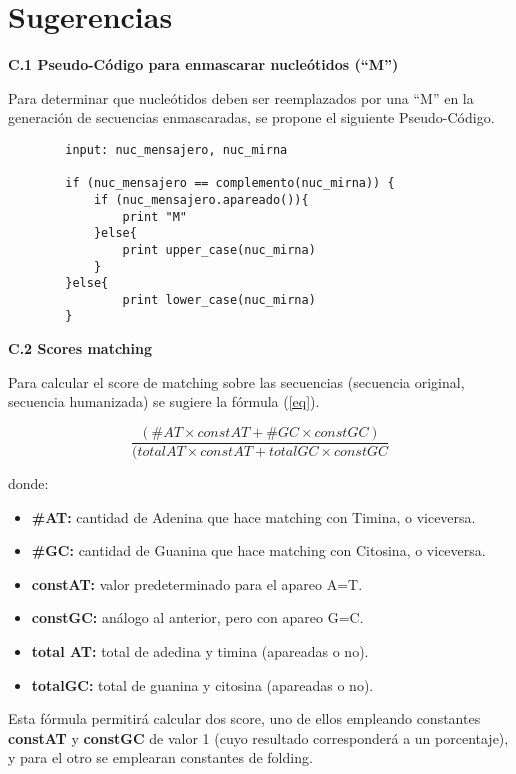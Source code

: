 \section{Sugerencias}
\label{appendix-formulates}

	\large \textbf{C.1 Pseudo-Código para enmascarar nucleótidos (``M'')}
	\par Para determinar que nucleótidos deben ser reemplazados por una ``M'' en la generación de secuencias enmascaradas, 		se propone el siguiente Pseudo-Código.

    \begin{verbatim}
        input: nuc_mensajero, nuc_mirna

        if (nuc_mensajero == complemento(nuc_mirna)) {
            if (nuc_mensajero.apareado()){
                print "M"
            }else{
                print upper_case(nuc_mirna)			
            }	
        }else{
                print lower_case(nuc_mirna)
        }                
    \end{verbatim}

	\large \textbf{C.2 Scores matching}
	\par Para calcular el score de matching sobre las secuencias (secuencia original, secuencia humanizada) se sugiere la 		fórmula (\ref{eq}).

	\begin{equation}	
		\label{eq} \frac{(\#AT \times constAT + \#GC \times constGC)}{(totalAT \times constAT + totalGC \times constGC}
	\end{equation}	

	\par donde:
		\begin{itemize}
			\item \textbf{\#AT:} cantidad de Adenina que hace matching con Timina, o viceversa.
			\item \textbf{\#GC:} cantidad de Guanina que hace matching con Citosina, o viceversa.
			\item \textbf{constAT:} valor predeterminado para el apareo A=T.
			\item \textbf{constGC:} análogo al anterior, pero con apareo G=C.
			\item \textbf{total AT:} total de adedina y timina (apareadas o no).
			\item \textbf{totalGC:} total de guanina y citosina (apareadas o no).	
		\end{itemize} 

	\par Esta fórmula permitirá calcular dos score, uno de ellos empleando constantes \textbf{constAT} y \textbf{constGC} 		de valor 1 (cuyo resultado corresponderá a un porcentaje), y para el otro se emplearan constantes de folding.
 
